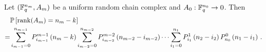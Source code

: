 


\begin{theorem}\label{thmProbranks}
Let $(\mathbb{F}_q^{n_m}, A_m)$ be a uniform random chain complex  and $A_0:\mathbb{F}_q^{n_0}\to 0$.  Then
\begin{align*}
 &  \mathbb{P}\left[\operatorname{\mathrm{rank}}(A_{m}) = n_{m} - k\right]\\
=& 	\sum_{i_{m-1}=0}^{n_{m-1}} P_{i_{m-1}}^{m-1}\left(n_{m} -k\right)
	\sum_{i_{m-2}=0}^{n_{m-2}} P_{i_{m-2}}^{m-2}\left(n_{m-2} - i_{m-2}\right)
		\cdots
        \sum_{i_1 = 0}^{n_1} P_{i_1}^1\left(n_2 - i_2\right) P_{n_0}^0 \left(n_1 - i_1\right) \, .
\end{align*}
\end{theorem}
